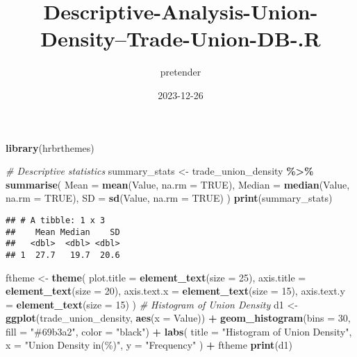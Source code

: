 \documentclass[
  ignorenonframetext,
]{beamer}
\title{Descriptive-Analysis-Union-Density--Trade-Union-DB-.R}
\author{pretender}
\date{2023-12-26}
\newenvironment{Shaded}{\begin{snugshade}}{\end{snugshade}}
\newcommand{\AttributeTok}[1]{\textcolor[rgb]{0.13,0.29,0.53}{#1}}
\newcommand{\CommentTok}[1]{\textcolor[rgb]{0.56,0.35,0.01}{\textit{#1}}}
\newcommand{\ConstantTok}[1]{\textcolor[rgb]{0.56,0.35,0.01}{#1}}
\newcommand{\DecValTok}[1]{\textcolor[rgb]{0.00,0.00,0.81}{#1}}
\newcommand{\FunctionTok}[1]{\textcolor[rgb]{0.13,0.29,0.53}{\textbf{#1}}}
\newcommand{\NormalTok}[1]{#1}
\newcommand{\OtherTok}[1]{\textcolor[rgb]{0.56,0.35,0.01}{#1}}
\newcommand{\SpecialCharTok}[1]{\textcolor[rgb]{0.81,0.36,0.00}{\textbf{#1}}}
\newcommand{\StringTok}[1]{\textcolor[rgb]{0.31,0.60,0.02}{#1}}
\begin{document}
\frame{\titlepage}

\begin{frame}[fragile]
\begin{Shaded}
\begin{Highlighting}[]
\FunctionTok{library}\NormalTok{(hrbrthemes)}

\CommentTok{\# Descriptive statistics}
\NormalTok{summary\_stats }\OtherTok{\textless{}{-}}\NormalTok{ trade\_union\_density }\SpecialCharTok{\%\textgreater{}\%}
  \FunctionTok{summarise}\NormalTok{(}
    \AttributeTok{Mean =} \FunctionTok{mean}\NormalTok{(Value, }\AttributeTok{na.rm =} \ConstantTok{TRUE}\NormalTok{),}
    \AttributeTok{Median =} \FunctionTok{median}\NormalTok{(Value, }\AttributeTok{na.rm =} \ConstantTok{TRUE}\NormalTok{),}
    \AttributeTok{SD =} \FunctionTok{sd}\NormalTok{(Value, }\AttributeTok{na.rm =} \ConstantTok{TRUE}\NormalTok{)}
\NormalTok{  )}
\FunctionTok{print}\NormalTok{(summary\_stats)}
\end{Highlighting}
\end{Shaded}

\begin{verbatim}
## # A tibble: 1 x 3
##    Mean Median    SD
##   <dbl>  <dbl> <dbl>
## 1  27.7   19.7  20.6
\end{verbatim}

\begin{Shaded}
\begin{Highlighting}[]
\NormalTok{ftheme }\OtherTok{\textless{}{-}} \FunctionTok{theme}\NormalTok{(}
  \AttributeTok{plot.title =} \FunctionTok{element\_text}\NormalTok{(}\AttributeTok{size =} \DecValTok{25}\NormalTok{),}
  \AttributeTok{axis.title =} \FunctionTok{element\_text}\NormalTok{(}\AttributeTok{size =} \DecValTok{20}\NormalTok{),}
  \AttributeTok{axis.text.x =} \FunctionTok{element\_text}\NormalTok{(}\AttributeTok{size =} \DecValTok{15}\NormalTok{),}
  \AttributeTok{axis.text.y =} \FunctionTok{element\_text}\NormalTok{(}\AttributeTok{size =} \DecValTok{15}\NormalTok{)}
\NormalTok{)}
\CommentTok{\# Histogram of Union Density}
\NormalTok{d1 }\OtherTok{\textless{}{-}} \FunctionTok{ggplot}\NormalTok{(trade\_union\_density, }\FunctionTok{aes}\NormalTok{(}\AttributeTok{x =}\NormalTok{ Value)) }\SpecialCharTok{+}
  \FunctionTok{geom\_histogram}\NormalTok{(}\AttributeTok{bins =} \DecValTok{30}\NormalTok{, }\AttributeTok{fill =} \StringTok{"\#69b3a2"}\NormalTok{, }\AttributeTok{color =} \StringTok{"black"}\NormalTok{) }\SpecialCharTok{+}
  \FunctionTok{labs}\NormalTok{(}
    \AttributeTok{title =} \StringTok{"Histogram of Union Density"}\NormalTok{,}
    \AttributeTok{x =} \StringTok{"Union Density in(\%)"}\NormalTok{,}
    \AttributeTok{y =} \StringTok{"Frequency"}
\NormalTok{  ) }\SpecialCharTok{+}
\NormalTok{  ftheme}
\FunctionTok{print}\NormalTok{(d1)}
\end{Highlighting}
\end{Shaded}


\end{frame}
\end{document}
